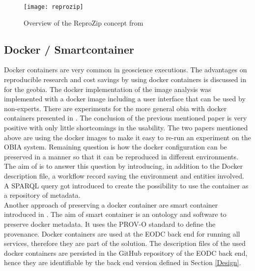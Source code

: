 \documentclass[draft,final]{vutinfth} %
\begin{document}
\begin{figure}[h]
	\centering
	\texttt{[image: reprozip]}
	\caption{Overview of the ReproZip concept from \cite{29c5846926a4497d95f276604cb0368c} }
	\label{fig:reprozip} %
\end{figure}

\subsection{Docker / Smartcontainer}\label{Smartcontainer}
Docker containers are very common in geoscience executions. The advantages on reproducible research and cost savings by using docker containers is discussed in \cite{rs9030290} for the \gls{geobia}. The docker implementation of the image analysis was implemented with a docker image including a user interface that can be used by non-experts. There are experiments for the more general \gls{obia} with docker containers presented in \cite{proceedings456}. The conclusion of the previous mentioned paper is very positive with only little shortcomings in the usability. The two papers mentioned above are using the docker images to make it easy to re-run an experiment on the OBIA system. Remaining question is how the docker configuration can be preserved in a manner so that it can be reproduced in different environments. The aim of \cite{emsley2017a} is to answer this question by introducing, in addition to the Docker description file, a workflow record saving the environment and entities involved. A SPARQL query got introduced to create the possibility to use the container as a repository of metadata.\\ 
Another approach of preserving a docker container are smart container introduced in \cite{Huo2015SmartCA}. The aim of smart container is an ontology and software to preserve docker metadata. It uses the PROV-O standard to define the provenance. 
Docker containers are used at the EODC back end for running all services, therefore they are part of the solution. The description files of the used docker containers are persisted in the GitHub repository of the EODC back end, hence they are identifiable by the back end version defined in Section \ref{Design}.   
\end{document}
